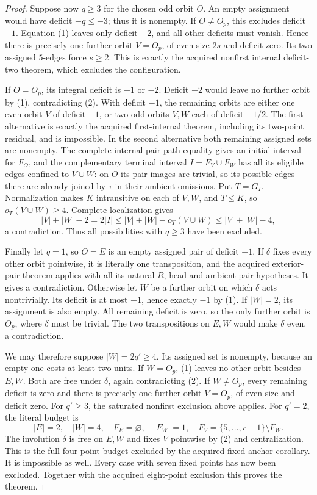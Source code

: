 \documentclass[11pt,a4paper]{article}
\begin{document}
\begin{proof}
Suppose now $q\ge3$ for the chosen odd orbit $O$.
An empty assignment would have deficit $-q\le-3$;
thus it is nonempty. If $O\ne O_p$, this excludes
deficit $-1$. Equation (1) leaves only deficit $-2$,
and all other deficits must vanish. Hence there
is precisely one further orbit $V=O_p$, of even
size $2s$ and deficit zero. Its two assigned
$5$-edges force $s\ge2$. This is exactly the
acquired nonfirst internal deficit-two theorem,
which excludes the configuration.

If $O=O_p$, its integral deficit is $-1$ or $-2$.
Deficit $-2$ would leave no further orbit by (1),
contradicting (2). With deficit $-1$, the remaining
orbits are either one even orbit $V$ of deficit
$-1$, or two odd orbits $V,W$ each of deficit
$-1/2$. The first alternative is exactly the
acquired first-internal theorem, including its
two-point residual, and is impossible.
In the second alternative both remaining assigned
sets are nonempty. The complete internal pair-path
equality gives an initial interval for $F_O$, and
the complementary terminal interval $I=F_V\cup F_W$
has all its eligible edges confined to $V\cup W$:
on $O$ its pair images are trivial, so its possible
edges there are already joined by $\tau$ in their
ambient omissions. Put $T=G_I$. Normalization makes
$K$ intransitive on each of $V,W$, and $T\le K$,
so $o_T(V\cup W)\ge4$. Complete localization gives
\[
 |V|+|W|-2=2|I|\le |V|+|W|-o_T(V\cup W)
                     \le |V|+|W|-4,
\]
a contradiction. Thus all possibilities with
$q\ge3$ have been excluded.

Finally let $q=1$, so $O=E$ is an empty assigned
pair of deficit $-1$. If $\delta$ fixes every other
orbit pointwise, it is literally one transposition,
and the acquired exterior-pair theorem applies with
all its natural-$R$, head and ambient-pair hypotheses.
It gives a contradiction. Otherwise let $W$ be a
further orbit on which $\delta$ acts nontrivially.
Its deficit is at most $-1$, hence exactly $-1$
by (1). If $|W|=2$, its assignment is also empty.
All remaining deficit is zero, so the only further
orbit is $O_p$, where $\delta$ must be trivial.
The two transpositions on $E,W$ would make $\delta$
even, a contradiction.

We may therefore suppose $|W|=2q'\ge4$. Its assigned
set is nonempty, because an empty one costs at least
two units. If $W=O_p$, (1) leaves no other orbit
besides $E,W$. Both are free under $\delta$, again
contradicting (2). If $W\ne O_p$, every remaining
deficit is zero and there is precisely one further
orbit $V=O_p$, of even size and deficit zero.
For $q'\ge3$, the saturated nonfirst exclusion above
applies. For $q'=2$, the literal budget is
\[
 |E|=2,\quad |W|=4,\quad
 F_E=\varnothing,\quad |F_W|=1,\quad
 F_V=\{5,\ldots,r-1\}\setminus F_W.
\]
The involution $\delta$ is free on $E,W$ and fixes
$V$ pointwise by (2) and centralization. This is
the full four-point budget excluded by the acquired
fixed-anchor corollary. It is impossible as well.
Every case with seven fixed points has now been
excluded. Together with the acquired eight-point
exclusion this proves the theorem.
\end{proof}
\end{document}
